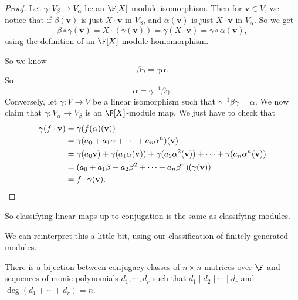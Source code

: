 \documentclass[a4paper]{article}
\begin{document}
\begin{proof}
  Let $\gamma: V_\beta \to V_\alpha$ be an $\F[X]$-module isomorphism. Then for $\mathbf{v} \in V$, we notice that if $\beta (\mathbf{v})$ is just $X \cdot \mathbf{v}$ in $V_\beta$, and $\alpha(\mathbf{v})$ is just $X \cdot \mathbf{v}$ in $V_\alpha$. So we get
  \[
    \beta \circ \gamma(\mathbf{v}) = X \cdot (\gamma(\mathbf{v})) = \gamma(X \cdot \mathbf{v}) = \gamma \circ \alpha(\mathbf{v}),
  \]
  using the definition of an $\F[X]$-module homomorphism.

  So we know
  \[
    \beta\gamma = \gamma\alpha.
  \]
  So
  \[
    \alpha = \gamma^{-1}\beta\gamma.
  \]
  Conversely, let $\gamma: V \to V$ be a linear isomorphism such that $\gamma^{-1}\beta\gamma = \alpha$. We now claim that $\gamma: V_\alpha \to V_\beta$ is an $\F[X]$-module map. We just have to check that
  \begin{align*}
    \gamma(f \cdot \mathbf{v}) &= \gamma(f(\alpha)(\mathbf{v})) \\
    &= \gamma(a_0 + a_1 \alpha + \cdots + a_n \alpha^n) (\mathbf{v})\\
    &= \gamma(a_0 \mathbf{v}) + \gamma(a_1 \alpha(\mathbf{v})) + \gamma (a_2 \alpha^2 (\mathbf{v})) + \cdots + \gamma(a_n \alpha^n(\mathbf{v}))\\
    &= (a_0 + a_1 \beta + a_2 \beta^2 + \cdots + a_n \beta^n)(\gamma(\mathbf{v}))\\
    &= f\cdot \gamma(\mathbf{v}).\qedhere
  \end{align*}
\end{proof}
So classifying linear maps up to conjugation is the same as classifying modules.

We can reinterpret this a little bit, using our classification of finitely-generated modules.
\begin{cor}
  There is a bijection between conjugacy classes of $n \times n$ matrices over $\F$ and sequences of monic polynomials $d_1, \cdots, d_r$ such that $d_1 \mid d_2 \mid \cdots \mid d_r$ and $\deg (d_1 + \cdots + d_r) = n$.
\end{cor}
\end{document}
